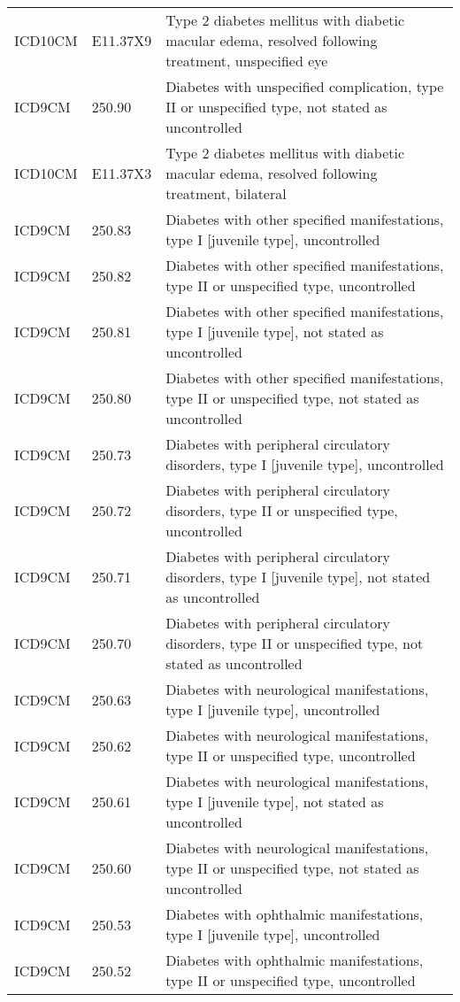 \begin{table}[ht]
\begin{tabular}{lll}
  ICD10CM & E11.37X9 & Type 2 diabetes mellitus with diabetic macular edema, resolved following treatment, unspecified eye \\ 
  ICD9CM & 250.90 & Diabetes with unspecified complication, type II or unspecified type, not stated as uncontrolled \\ 
  ICD10CM & E11.37X3 & Type 2 diabetes mellitus with diabetic macular edema, resolved following treatment, bilateral \\ 
  ICD9CM & 250.83 & Diabetes with other specified manifestations, type I [juvenile type], uncontrolled \\ 
  ICD9CM & 250.82 & Diabetes with other specified manifestations, type II or unspecified type, uncontrolled \\ 
  ICD9CM & 250.81 & Diabetes with other specified manifestations, type I [juvenile type], not stated as uncontrolled \\ 
  ICD9CM & 250.80 & Diabetes with other specified manifestations, type II or unspecified type, not stated as uncontrolled \\ 
  ICD9CM & 250.73 & Diabetes with peripheral circulatory disorders, type I [juvenile type], uncontrolled \\ 
  ICD9CM & 250.72 & Diabetes with peripheral circulatory disorders, type II or unspecified type, uncontrolled \\ 
  ICD9CM & 250.71 & Diabetes with peripheral circulatory disorders, type I [juvenile type], not stated as uncontrolled \\ 
  ICD9CM & 250.70 & Diabetes with peripheral circulatory disorders, type II or unspecified type, not stated as uncontrolled \\ 
  ICD9CM & 250.63 & Diabetes with neurological manifestations, type I [juvenile type], uncontrolled \\ 
  ICD9CM & 250.62 & Diabetes with neurological manifestations, type II or unspecified type, uncontrolled \\ 
  ICD9CM & 250.61 & Diabetes with neurological manifestations, type I [juvenile type], not stated as uncontrolled \\ 
  ICD9CM & 250.60 & Diabetes with neurological manifestations, type II or unspecified type, not stated as uncontrolled \\ 
  ICD9CM & 250.53 & Diabetes with ophthalmic manifestations, type I [juvenile type], uncontrolled \\ 
  ICD9CM & 250.52 & Diabetes with ophthalmic manifestations, type II or unspecified type, uncontrolled \\ 

\end{tabular}
\end{table}

